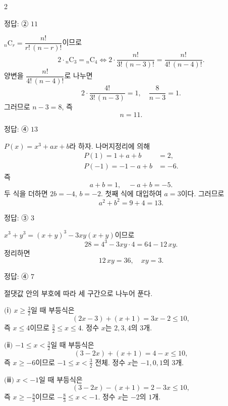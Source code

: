 \documentclass[10pt]{article}
\begin{document}
\begin{multicols}{2}
\begin{answerbox}정답: ② $11$\end{answerbox}

${}_n\mathrm{C}_r = \dfrac{n!}{r! \, (n-r)!}$이므로
\[ 2 \cdot {}_n\mathrm{C}_3 = {}_n\mathrm{C}_4 \iff 2 \cdot \dfrac{n!}{3! \, (n-3)!} = \dfrac{n!}{4! \, (n-4)!}. \]
양변을 $\dfrac{n!}{4! \, (n-4)!}$로 나누면
\[ 2 \cdot \dfrac{4!}{3! \, (n-3)} = 1, \quad \dfrac{8}{n - 3} = 1. \]
그러므로 $n - 3 = 8$, 즉
\[ n = 11. \]

\begin{answerbox}정답: ④ $13$\end{answerbox}

$P(x) = x^3 + ax + b$라 하자. 나머지정리에 의해
\begin{align*}
P(1) = 1 + a + b &= 2, \\
P(-1) = -1 - a + b &= -6.
\end{align*}
즉
\[ a + b = 1, \quad -a + b = -5. \]
두 식을 더하면 $2b = -4$, $b = -2$. 첫째 식에 대입하여 $a = 3$이다. 그러므로
\[ a^2 + b^2 = 9 + 4 = 13. \]

\begin{answerbox}정답: ③ $3$\end{answerbox}

$x^3 + y^3 = (x + y)^3 - 3xy(x + y)$이므로
\[ 28 = 4^3 - 3xy \cdot 4 = 64 - 12\, xy. \]
정리하면
\[ 12\, xy = 36, \quad xy = 3. \]

\begin{answerbox}정답: ④ $7$\end{answerbox}

절댓값 안의 부호에 따라 세 구간으로 나누어 푼다.

$(\!$ⅰ$)$ $x \ge \tfrac{3}{2}$일 때 부등식은
\[ (2x - 3) + (x + 1) = 3x - 2 \le 10, \]
즉 $x \le 4$이므로 $\tfrac{3}{2} \le x \le 4$. 정수 $x$는 $2, 3, 4$의 $3$개.

$(\!$ⅱ$)$ $-1 \le x < \tfrac{3}{2}$일 때 부등식은
\[ (3 - 2x) + (x + 1) = 4 - x \le 10, \]
즉 $x \ge -6$이므로 $-1 \le x < \tfrac{3}{2}$ 전체. 정수 $x$는 $-1, 0, 1$의 $3$개.

$(\!$ⅲ$)$ $x < -1$일 때 부등식은
\[ (3 - 2x) - (x + 1) = 2 - 3x \le 10, \]
즉 $x \ge -\tfrac{8}{3}$이므로 $-\tfrac{8}{3} \le x < -1$. 정수 $x$는 $-2$의 $1$개.


\end{multicols}
\end{document}
